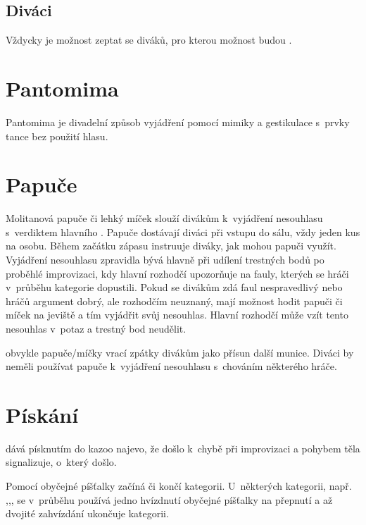 \subsection{ Diváci } Vždycky je možnost zeptat se diváků, pro kterou možnost budou . 
 
 
 
\needspace{5cm} \section{Pantomima} \label{pantomima} Pantomima je divadelní způsob vyjádření pomocí mimiky a gestikulace s~prvky tance bez použití hlasu.  
 
 
 
\needspace{5cm} \section{Papuče} \label{papuče} Molitanová papuče či lehký míček slouží divákům k~vyjádření nesouhlasu s~verdiktem hlavního . Papuče dostávají diváci při vstupu do sálu, vždy jeden kus na osobu. Během začátku zápasu instruuje  diváky, jak mohou papuči využít. Vyjádření nesouhlasu zpravidla bývá hlavně při udílení trestných bodů po proběhlé improvizaci, kdy hlavní rozhodčí upozorňuje na fauly, kterých se hráči v~průběhu kategorie dopustili. Pokud se divákům zdá faul nespravedlivý nebo hráčů argument dobrý, ale rozhodčím neuznaný, mají možnost hodit papuči či míček na jeviště a tím vyjádřit svůj nesouhlas. Hlavní rozhodčí může vzít tento nesouhlas v~potaz a trestný bod neudělit. 
 
 obvykle papuče/míčky vrací zpátky divákům jako  přísun další munice.  
Diváci by neměli používat papuče k~vyjádření nesouhlasu s~chováním některého hráče. 
 
 
\needspace{5cm} \section{Pískání} \label{pískání}  dává písknutím do kazoo najevo, že došlo k~chybě při improvizaci a pohybem těla signalizuje, o~který  došlo. 
 
Pomocí obyčejné píšťalky začíná či končí kategorii. 
U~některých kategorii, např. ,,, se v~průběhu používá jedno hvízdnutí obyčejné píšťalky na přepnutí a až dvojité zahvízdání ukončuje kategorii. 
 
